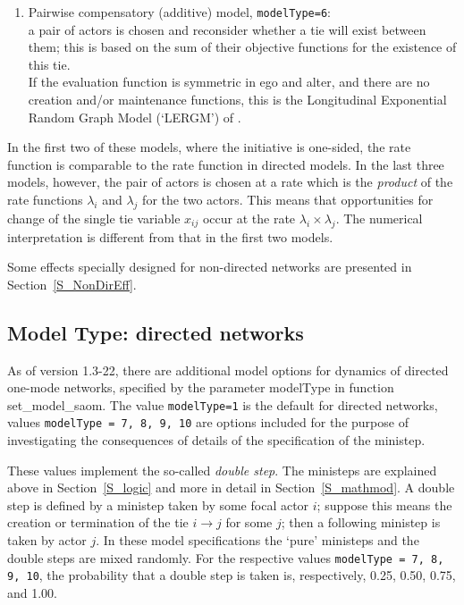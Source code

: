 \documentclass[a4paper,fleqn,11pt]{article}
\newcommand{\+}{\, + \,}
\newcommand{\sfn}[1]{\textsf{#1}}
\begin{document}
\begin{enumerate}
      the tie will exist if both agree,
      it will not exist if at least one does not choose for it.
\item Pairwise compensatory (additive) model,
      \texttt{modelType=6}:\\ %
      a pair of actors is chosen and reconsider
      whether a tie will exist between them;
      this is based on the sum of their objective functions
      for the existence of this tie.\\
      If the evaluation function is symmetric in ego and alter,
      and there are no creation and/or maintenance functions,
      this is the Longitudinal Exponential Random Graph Model
      (`LERGM') of \citet{KoskinenSnijders2013}.
\end{enumerate}
In the first two of these models, where the initiative is one-sided,
the rate function is comparable to the rate function in directed models.
In the last three models, however, the pair of actors is chosen at a rate
which is the \emph{product} of the rate functions
$\lambda_i$ and $\lambda_j$ for the two actors.
This means that opportunities for change of the single tie variable $x_{ij}$
occur at the rate $\lambda_i \times \lambda_j$.
The numerical interpretation is different from that in the first two models.

Some effects specially designed for non-directed networks
are presented in Section~\ref{S_NonDirEff}.


\subsection{Model Type: directed networks}
\label{S_modeltype_dir}

As of version 1.3-22, there are additional model options for dynamics
of directed one-mode networks, specified by the parameter \sfn{modelType} in function
\textsf{set\_model\_saom}.
The value \texttt{modelType=1} is the default for directed networks, values
\texttt{modelType = 7, 8, 9, 10} are options included for the purpose
of investigating the consequences of details of the specification of the ministep.

These values implement the so-called \emph{double step}.
The ministeps are explained above in Section~\ref{S_logic} and more in detail
in Section~\ref{S_mathmod}.
A double step is defined by a ministep taken by some focal actor $i$;
suppose this means the creation or termination of the tie
$i \rightarrow j$ for some $j$; then a following ministep is taken by actor $j$.
In these model specifications the `pure' ministeps and the double steps
are mixed randomly.
For the respective values \texttt{modelType = 7, 8, 9, 10},
the probability that a double step is taken is, respectively,
0.25, 0.50, 0.75, and 1.00.
\end{document}
